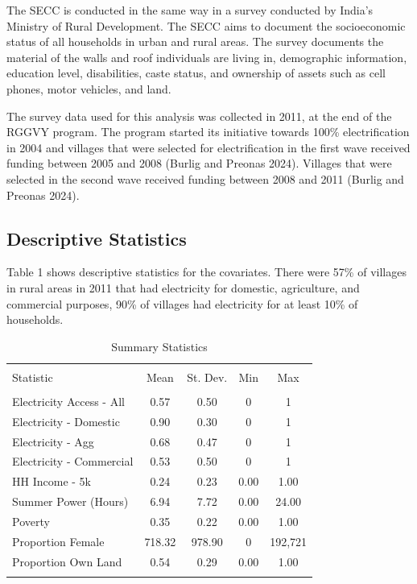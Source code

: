 \documentclass[
]{article}
\begin{document}
The SECC is conducted in the same way in a survey conducted by India's
Ministry of Rural Development. The SECC aims to document the
socioeconomic status of all households in urban and rural areas. The
survey documents the material of the walls and roof individuals are
living in, demographic information, education level, disabilities, caste
status, and ownership of assets such as cell phones, motor vehicles, and
land.

The survey data used for this analysis was collected in 2011, at the end
of the RGGVY program. The program started its initiative towards 100\%
electrification in 2004 and villages that were selected for
electrification in the first wave received funding between 2005 and 2008
(Burlig and Preonas 2024). Villages that were selected in the second
wave received funding between 2008 and 2011 (Burlig and Preonas 2024).

\hypertarget{descriptive-statistics}{%
\subsection{Descriptive Statistics}\label{descriptive-statistics}}

Table 1 shows descriptive statistics for the covariates. There were 57\%
of villages in rural areas in 2011 that had electricity for domestic,
agriculture, and commercial purposes, 90\% of villages had electricity
for at least 10\% of households.

\begin{table}[!htbp] \centering 
  \caption{Summary Statistics} 
  \label{} 
\begin{tabular}{@{\extracolsep{5pt}}lcccc} 
\\[-1.8ex]\hline 
\hline \\[-1.8ex] 
Statistic & \multicolumn{1}{c}{Mean} & \multicolumn{1}{c}{St. Dev.} & \multicolumn{1}{c}{Min} & \multicolumn{1}{c}{Max} \\ 
\hline \\[-1.8ex] 
Electricity Access - All & 0.57 & 0.50 & 0 & 1 \\ 
Electricity - Domestic & 0.90 & 0.30 & 0 & 1 \\ 
Electricity - Agg & 0.68 & 0.47 & 0 & 1 \\ 
Electricity - Commercial & 0.53 & 0.50 & 0 & 1 \\ 
HH Income - 5k & 0.24 & 0.23 & 0.00 & 1.00 \\ 
Summer Power (Hours) & 6.94 & 7.72 & 0.00 & 24.00 \\ 
Poverty & 0.35 & 0.22 & 0.00 & 1.00 \\ 
Proportion Female & 718.32 & 978.90 & 0 & 192,721 \\ 
Proportion Own Land & 0.54 & 0.29 & 0.00 & 1.00 \\ 
\hline \\[-1.8ex] 
\end{tabular} 
\end{table} 
\end{document}
